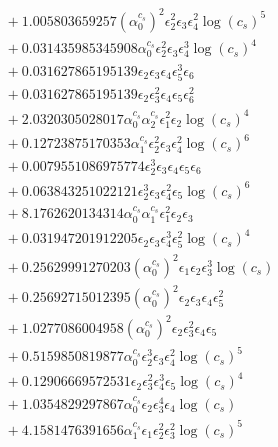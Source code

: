 \documentclass[10pt]{article}
\begin{document}
\begin{align*}
&{}  + 1.005803659257 \left(\alpha_{0}^{c_s}\right)^{2} \epsilon_{2}^{2} \epsilon_{3} \epsilon_{4}^{2} \log{\left(c_{s} \right)}^{5} \\
&{}  + 0.031435985345908 \alpha_{0}^{c_s} \epsilon_{2}^{2} \epsilon_{3} \epsilon_{4}^{3} \log{\left(c_{s} \right)}^{4} \\
&{}  + 0.031627865195139 \epsilon_{2} \epsilon_{3} \epsilon_{4} \epsilon_{5}^{3} \epsilon_{6} \\
&{}  + 0.031627865195139 \epsilon_{2} \epsilon_{3}^{2} \epsilon_{4} \epsilon_{5} \epsilon_{6}^{2} \\
&{}  + 2.0320305028017 \alpha_{0}^{c_s} \alpha_{2}^{c_s} \epsilon_{1}^{2} \epsilon_{2} \log{\left(c_{s} \right)}^{4} \\
&{}  + 0.12723875170353 \alpha_{1}^{c_s} \epsilon_{2}^{2} \epsilon_{3} \epsilon_{4}^{2} \log{\left(c_{s} \right)}^{6} \\
&{}  + 0.0079551086975774 \epsilon_{2}^{3} \epsilon_{3} \epsilon_{4} \epsilon_{5} \epsilon_{6} \\
&{}  + 0.063843251022121 \epsilon_{2}^{3} \epsilon_{3} \epsilon_{4}^{2} \epsilon_{5} \log{\left(c_{s} \right)}^{6} \\
&{}  + 8.1762620134314 \alpha_{0}^{c_s} \alpha_{1}^{c_s} \epsilon_{1}^{2} \epsilon_{2} \epsilon_{3} \\
&{}  + 0.031947201912205 \epsilon_{2} \epsilon_{3} \epsilon_{4}^{3} \epsilon_{5}^{2} \log{\left(c_{s} \right)}^{4} \\
&{}  + 0.25629991270203 \left(\alpha_{0}^{c_s}\right)^{2} \epsilon_{1} \epsilon_{2} \epsilon_{3}^{3} \log{\left(c_{s} \right)} \\
&{}  + 0.25692715012395 \left(\alpha_{0}^{c_s}\right)^{2} \epsilon_{2} \epsilon_{3} \epsilon_{4} \epsilon_{5}^{2} \\
&{}  + 1.0277086004958 \left(\alpha_{0}^{c_s}\right)^{2} \epsilon_{2} \epsilon_{3}^{2} \epsilon_{4} \epsilon_{5} \\
&{}  + 0.5159850819877 \alpha_{0}^{c_s} \epsilon_{2}^{3} \epsilon_{3} \epsilon_{4}^{2} \log{\left(c_{s} \right)}^{5} \\
&{}  + 0.12906669572531 \epsilon_{2} \epsilon_{3}^{2} \epsilon_{4}^{3} \epsilon_{5} \log{\left(c_{s} \right)}^{4} \\
&{}  + 1.0354829297867 \alpha_{0}^{c_s} \epsilon_{2} \epsilon_{3}^{4} \epsilon_{4} \log{\left(c_{s} \right)} \\
&{}  + 4.1581476391656 \alpha_{1}^{c_s} \epsilon_{1} \epsilon_{2}^{2} \epsilon_{3}^{2} \log{\left(c_{s} \right)}^{5} \\

\end{align*}
\end{document}
